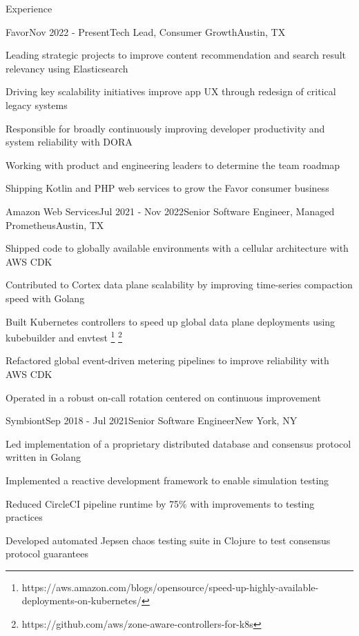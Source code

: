 \documentclass[
	11pt, %
]{resume} %
\begin{document}
\begin{rSection}{Experience}

	\begin{rSubsection}{Favor}{Nov 2022 - Present}{Tech Lead, Consumer Growth}{Austin, TX}
        \item Leading strategic projects to improve content recommendation and search result relevancy using Elasticsearch
        \item Driving key scalability initiatives improve app UX through redesign of critical legacy systems
        \item Responsible for broadly continuously improving developer productivity and system reliability with DORA
        \item Working with product and engineering leaders to determine the team roadmap
        \item Shipping Kotlin and PHP web services to grow the Favor consumer business
	\end{rSubsection}


    \begin{rSubsection}{Amazon Web Services}{Jul 2021 - Nov 2022}{Senior Software Engineer, Managed Prometheus}{Austin, TX}
        \item Shipped code to globally available environments with a cellular architecture with AWS CDK
        \item Contributed to Cortex data plane scalability by improving time-series compaction speed with Golang
        \item Built Kubernetes controllers to speed up global data plane deployments using kubebuilder and envtest \footnote{https://aws.amazon.com/blogs/opensource/speed-up-highly-available-deployments-on-kubernetes/} \footnote{https://github.com/aws/zone-aware-controllers-for-k8s}
        \item Refactored global event-driven metering pipelines to improve reliability with AWS CDK
        \item Operated in a robust on-call rotation centered on continuous improvement
    \end{rSubsection}

    \begin{rSubsection}{Symbiont}{Sep 2018 - Jul 2021}{Senior Software Engineer}{New York, NY}
        \item Led implementation of a proprietary distributed database and consensus protocol written in Golang
        \item Implemented a reactive development framework to enable simulation testing
        \item Reduced CircleCI pipeline runtime by 75\% with improvements to testing practices
        \item Developed automated Jepsen chaos testing suite in Clojure to test consensus protocol guarantees
    \end{rSubsection}


\end{rSection}
\end{document}
